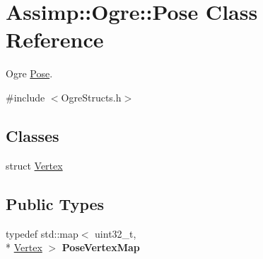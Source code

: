 \hypertarget{class_assimp_1_1_ogre_1_1_pose}{\section{Assimp\+:\+:Ogre\+:\+:Pose Class Reference}
\label{class_assimp_1_1_ogre_1_1_pose}
}


Ogre \hyperlink{class_assimp_1_1_ogre_1_1_pose}{Pose}.  




{\ttfamily \#include $<$Ogre\+Structs.\+h$>$}

\subsection*{Classes}
\begin{DoxyCompactItemize}
\item 
struct \hyperlink{struct_assimp_1_1_ogre_1_1_pose_1_1_vertex}{Vertex}
\end{DoxyCompactItemize}
\subsection*{Public Types}
\begin{DoxyCompactItemize}
\item 
\hypertarget{class_assimp_1_1_ogre_1_1_pose_aaefc533b467424e5cc2c04642969628f}{typedef std\+::map$<$ uint32\+\_\+t, \\*
\hyperlink{struct_assimp_1_1_ogre_1_1_pose_1_1_vertex}{Vertex} $>$ {\bfseries Pose\+Vertex\+Map}}\label{class_assimp_1_1_ogre_1_1_pose_aaefc533b467424e5cc2c04642969628f}

\end{DoxyCompactItemize}
